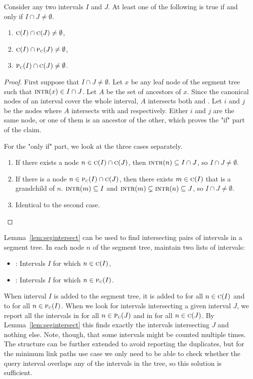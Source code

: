 \documentclass[english,gradu]{tktltiki2018}
\begin{document}
\begin{lem}\label{lem:segintersect}Consider any two intervals $I$ and $J$.
At least one of the following is true if and only if $I\cap J\neq\emptyset$.
\begin{enumerate}
\item $\textsc{c}(I)\cap\textsc{c}(J)\neq\emptyset$,
\item $\textsc{c}(I)\cap\textsc{p}_{\textsc{c}}(J)\neq\emptyset$,
\item $\textsc{p}_{\textsc{c}}(I)\cap\textsc{c}(J)\neq\emptyset$.
\end{enumerate}
\end{lem}
\begin{proof}
First suppose that $I\cap J\neq\emptyset$.
Let $x$ be any leaf node of the segment tree such that $\textsc{intr}(x)\in I\cap J$.
Let $A$ be the set of ancestors of $x$.
Since the canonical nodes of an interval cover the whole interval, $A$ intersects both  and .
Let $i$ and $j$ be the nodes where $A$ intersects with  and  respectively.
Either $i$ and $j$ are the same node, or one of them is an ancestor of the other, which proves the "if" part of the claim.

For the "only if" part, we look at the three cases separately.
\begin{enumerate}
\item If there exists a node $n\in\textsc{c}(I)\cap\textsc{c}(J)$, then $\textsc{intr}(n)\subseteq I\cap J$, so $I\cap J\neq\emptyset$.
\item If there is a node $n\in\textsc{p}_{\textsc{c}}(I)\cap\textsc{c}(J)$, then there exists $m\in\textsc{c}(I)$ that is a grandchild of $n$. $\textsc{intr}(m)\subseteq I$ and $\textsc{intr}(m)\subsetneq\textsc{intr}(n)\subseteq J$, so $I\cap J\neq\emptyset$.
\item Identical to the second case.
\end{enumerate}
\end{proof}

Lemma~\ref{lem:segintersect} can be used to find intersecting pairs of intervals in a segment tree.
In each node $n$ of the segment tree, maintain two lists of intervals:
\begin{itemize}
\item {}: Intervals $I$ for which $n\in\textsc{c}(I)$,
\item {}: Intervals $I$ for which $n\in\textsc{p}_{\textsc{c}}(I)$.
\end{itemize}
When interval $I$ is added to the segment tree, it is added to  for all $n\in\textsc{c}(I)$ and to  for all $n\in\textsc{p}_{\textsc{c}}(I)$.
When we look for intervals intersecting a given interval $J$, we report all the intervals in  for all $n\in\textsc{p}_{\textsc{c}}(J)$ and in  for all $n\in\textsc{c}(J)$.
By Lemma~\ref{lem:segintersect} this finds exactly the intervals intersecting $J$ and nothing else.
Note, though, that some intervals might be counted multiple times.
The structure can be further extended to avoid reporting the duplicates, but for the minimum link paths use case we only need to be able to check whether the query interval overlaps any of the intervals in the tree, so this solution is sufficient.
\end{document}
